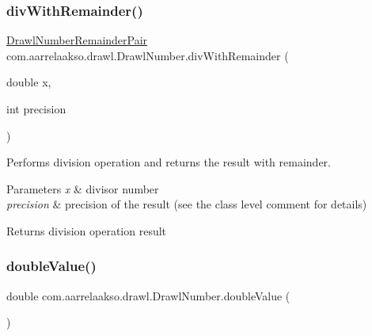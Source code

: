 \subsubsection{\texorpdfstring{div\+With\+Remainder()}{divWithRemainder()}\hspace{0.1cm}{\footnotesize\ttfamily [2/2]}}
{\footnotesize\ttfamily \hyperlink{classcom_1_1aarrelaakso_1_1drawl_1_1_drawl_number_remainder_pair}{Drawl\+Number\+Remainder\+Pair} com.\+aarrelaakso.\+drawl.\+Drawl\+Number.\+div\+With\+Remainder (\begin{DoxyParamCaption}\item[{double}]{x,  }\item[{int}]{precision }\end{DoxyParamCaption})\hspace{0.3cm}{\ttfamily [protected]}}



Performs division operation and returns the result with remainder. 


\begin{DoxyParams}{Parameters}
{\em x} & divisor number \\
\hline
{\em precision} & precision of the result (see the class level comment for details) \\
\hline
\end{DoxyParams}
\begin{DoxyReturn}{Returns}
division operation result 
\end{DoxyReturn}
\mbox{\label{classcom_1_1aarrelaakso_1_1drawl_1_1_drawl_number_af5e6d77e51e7b6167d18acec2eb26877}} 
\subsubsection{\texorpdfstring{double\+Value()}{doubleValue()}}
{\footnotesize\ttfamily double com.\+aarrelaakso.\+drawl.\+Drawl\+Number.\+double\+Value (\begin{DoxyParamCaption}{ }\end{DoxyParamCaption})\hspace{0.3cm}{\ttfamily [protected]}}




